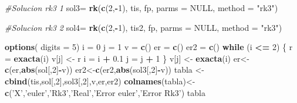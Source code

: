 \documentclass[]{article}
\newenvironment{Shaded}{\begin{snugshade}}{\end{snugshade}}
\newcommand{\KeywordTok}[1]{\textcolor[rgb]{0.13,0.29,0.53}{\textbf{#1}}}
\newcommand{\DataTypeTok}[1]{\textcolor[rgb]{0.13,0.29,0.53}{#1}}
\newcommand{\DecValTok}[1]{\textcolor[rgb]{0.00,0.00,0.81}{#1}}
\newcommand{\FloatTok}[1]{\textcolor[rgb]{0.00,0.00,0.81}{#1}}
\newcommand{\StringTok}[1]{\textcolor[rgb]{0.31,0.60,0.02}{#1}}
\newcommand{\CommentTok}[1]{\textcolor[rgb]{0.56,0.35,0.01}{\textit{#1}}}
\newcommand{\OtherTok}[1]{\textcolor[rgb]{0.56,0.35,0.01}{#1}}
\newcommand{\ControlFlowTok}[1]{\textcolor[rgb]{0.13,0.29,0.53}{\textbf{#1}}}
\newcommand{\OperatorTok}[1]{\textcolor[rgb]{0.81,0.36,0.00}{\textbf{#1}}}
\newcommand{\NormalTok}[1]{#1}
\begin{document}
\begin{Shaded}
\begin{Highlighting}[]
\CommentTok{#Solucion rk3 1}
\NormalTok{sol3=}\StringTok{ }\KeywordTok{rk}\NormalTok{(}\KeywordTok{c}\NormalTok{(}\DecValTok{2}\NormalTok{,}\OperatorTok{-}\DecValTok{1}\NormalTok{), tis, fp, }\DataTypeTok{parms =} \OtherTok{NULL}\NormalTok{, }\DataTypeTok{method =} \StringTok{"rk3"}\NormalTok{)}


\CommentTok{#Solucion rk3 2}
\NormalTok{sol4=}\StringTok{ }\KeywordTok{rk}\NormalTok{(}\KeywordTok{c}\NormalTok{(}\DecValTok{2}\NormalTok{,}\OperatorTok{-}\DecValTok{1}\NormalTok{), tis2, fp, }\DataTypeTok{parms =} \OtherTok{NULL}\NormalTok{, }\DataTypeTok{method =} \StringTok{"rk3"}\NormalTok{)}

\KeywordTok{options}\NormalTok{( }\DataTypeTok{digits =} \DecValTok{5}\NormalTok{)}
\NormalTok{i =}\StringTok{ }\DecValTok{0}
\NormalTok{j =}\StringTok{ }\DecValTok{1}
\NormalTok{v =}\StringTok{ }\KeywordTok{c}\NormalTok{()}
\NormalTok{er =}\StringTok{ }\KeywordTok{c}\NormalTok{()}
\NormalTok{er2 =}\StringTok{ }\KeywordTok{c}\NormalTok{()}
\ControlFlowTok{while}\NormalTok{ (i }\OperatorTok{<=}\StringTok{ }\DecValTok{2}\NormalTok{)}
\NormalTok{\{}
\NormalTok{  r =}\StringTok{ }\KeywordTok{exacta}\NormalTok{(i)}
\NormalTok{  v[j] <-}\StringTok{ }\NormalTok{r}
\NormalTok{  i =}\StringTok{ }\NormalTok{i }\OperatorTok{+}\StringTok{ }\FloatTok{0.1}
\NormalTok{  j =}\StringTok{ }\NormalTok{j }\OperatorTok{+}\StringTok{ }\DecValTok{1}
\NormalTok{\}}
\NormalTok{v[j] <-}\StringTok{ }\KeywordTok{exacta}\NormalTok{(i)}
\NormalTok{er<-}\KeywordTok{c}\NormalTok{(er,}\KeywordTok{abs}\NormalTok{(sol[,}\DecValTok{2}\NormalTok{]}\OperatorTok{-}\NormalTok{v))}
\NormalTok{er2<-}\KeywordTok{c}\NormalTok{(er2,}\KeywordTok{abs}\NormalTok{(sol3[,}\DecValTok{2}\NormalTok{]}\OperatorTok{-}\NormalTok{v))}
\NormalTok{tabla <-}\StringTok{ }\KeywordTok{cbind}\NormalTok{(tis,sol[,}\DecValTok{2}\NormalTok{],sol3[,}\DecValTok{2}\NormalTok{],v,er,er2)}
\KeywordTok{colnames}\NormalTok{(tabla)<-}\KeywordTok{c}\NormalTok{(}\StringTok{'X'}\NormalTok{,}\StringTok{'euler'}\NormalTok{,}\StringTok{'Rk3'}\NormalTok{,}\StringTok{'Real'}\NormalTok{,}\StringTok{'Error euler'}\NormalTok{,}\StringTok{'Error Rk3'}\NormalTok{)}
\NormalTok{tabla}
\end{Highlighting}
\end{Shaded}
\end{document}
